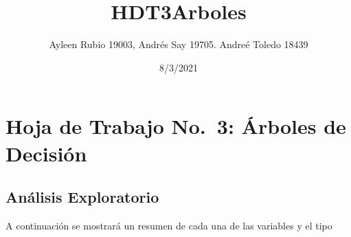 \documentclass[
]{article}
\title{HDT3Arboles}
\author{Ayleen Rubio 19003, Andrés Say 19705. Andreé Toledo 18439}
\date{8/3/2021}
\begin{document}
\maketitle

\hypertarget{hoja-de-trabajo-no.-3-uxe1rboles-de-decisiuxf3n}{%
\section{Hoja de Trabajo No.~3: Árboles de
Decisión}\label{hoja-de-trabajo-no.-3-uxe1rboles-de-decisiuxf3n}}

\hypertarget{anuxe1lisis-exploratorio}{%
\subsection{Análisis Exploratorio}\label{anuxe1lisis-exploratorio}}

A continuación se mostrará un resumen de cada una de las variables y el
tipo
\end{document}
